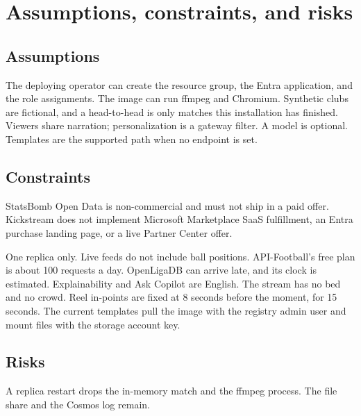 \documentclass[11pt]{article}
\begin{document}
\section{Assumptions, constraints, and risks}

\subsection{Assumptions}

The deploying operator can create the resource group, the Entra application, and
the role assignments.
The image can run ffmpeg and Chromium.
Synthetic clubs are fictional, and a head-to-head is only matches this
installation has finished.
Viewers share narration; personalization is a gateway filter.
A model is optional. Templates are the supported path when no endpoint is set.

\subsection{Constraints}

StatsBomb Open Data is non-commercial and must not ship in a paid offer.
Kickstream does not implement Microsoft Marketplace SaaS fulfillment, an Entra
purchase landing page, or a live Partner Center offer.

One replica only.
Live feeds do not include ball positions.
API-Football's free plan is about 100 requests a day.
OpenLigaDB can arrive late, and its clock is estimated.
Explainability and Ask Copilot are English.
The stream has no bed and no crowd.
Reel in-points are fixed at 8 seconds before the moment, for 15 seconds.
The current templates pull the image with the registry admin user and mount
files with the storage account key.

\subsection{Risks}

A replica restart drops the in-memory match and the ffmpeg process.
The file share and the Cosmos log remain.

\begin{center}
\end{center}
\end{document}
